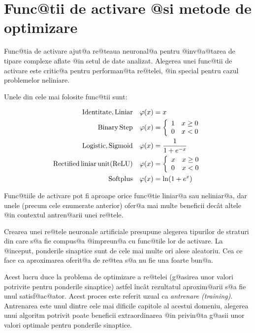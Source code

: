 \section{Func@tii de activare @si metode de optimizare}

Func@tia de activare ajut@a re@teaua neuronal@a pentru @inv@a@tarea de tipare complexe aflate @in setul de date analizat. Alegerea unei func@tii de activare este critic@a pentru performan@ta re@telei, @in special pentru cazul problemelor neliniare.

Unele din cele mai folosite func@tii sunt:

\begin{align}
	{\rm Identitate, Liniar} \quad \varphi (x) &= x \label{eq:liniar} \\
	{\rm Binary \, Step} \quad \varphi (x) &= \left\lbrace
		\begin{array}{lc}
			1 & x \geq 0 \\
			0 & x < 0
		\end{array}
	\right. \\
	{\rm Logistic, Sigmoid} \quad \varphi (x) &= \displaystyle\frac{1}{1 + e^{-x}} \\
	{\rm Rectified\, liniar\, unit (ReLU)} \quad \varphi (x) &= \left\lbrace
		\begin{array}{lc}
			x & x \geq 0 \\
			0 & x < 0
		\end{array}
	\right. \label{eq:relu} \\
	{\rm Softplus} \quad \varphi (x) &= \ln ( 1 + e^x) 
\end{align}

Func@tiile de activare pot fi aproape orice func@tie liniar@a sau neliniar@a, dar unele  (precum cele enumerate anterior) ofer@a mai multe beneficii dec\^ at altele @in contextul antren@arii unei re@tele.

Crearea unei re@tele neuronale artificiale presupune alegerea tipurilor de straturi din care s@a fie compus@a @impreun@a cu func@tile lor de activare. La @inceput, ponderile sinaptice sunt de cele mai multe ori alese aleatoriu. Cea ce face ca aproximarea oferit@a de re@tea s@a nu fie una foarte bun@a.

Acest lucru duce la problema de optimizare a re@telei (g@asirea unor valori potrivite pentru ponderile sinaptice) astfel \^inc\^ at rezultatul aproxim@arii s@a fie unul satisf@ac@ator. Acest proces este referit uzual ca {\sl antrenare (training)}. Antrenarea este unul dintre cele mai dificile capitole al acestui domeniu, alegerea unui algoritm potrivit poate beneficii extraordinarea @in privin@ta g@asii unor valori optimale pentru ponderile sinaptice.

